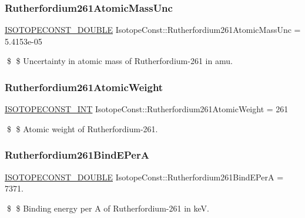 \subsubsection{\texorpdfstring{Rutherfordium261\+Atomic\+Mass\+Unc}{Rutherfordium261AtomicMassUnc}}
{\footnotesize\ttfamily \mbox{\hyperlink{group___isotope_const-_macros_ga8f45a7272ce02c0b4c65c44636ed719a}{I\+S\+O\+T\+O\+P\+E\+C\+O\+N\+S\+T\+\_\+\+D\+O\+U\+B\+LE}} Isotope\+Const\+::\+Rutherfordium261\+Atomic\+Mass\+Unc = 5.\+4153e-\/05}

\$ \$ Uncertainty in atomic mass of Rutherfordium-\/261 in amu. \mbox{\label{group___isotope_const-_rutherfordium-_rf261_ga20d02417a0fca27503c16a4dd4f8ef2a}} 
\subsubsection{\texorpdfstring{Rutherfordium261\+Atomic\+Weight}{Rutherfordium261AtomicWeight}}
{\footnotesize\ttfamily \mbox{\hyperlink{group___isotope_const-_macros_ga5f18360b3e99483a35c32d789e62621c}{I\+S\+O\+T\+O\+P\+E\+C\+O\+N\+S\+T\+\_\+\+I\+NT}} Isotope\+Const\+::\+Rutherfordium261\+Atomic\+Weight = 261}

\$ \$ Atomic weight of Rutherfordium-\/261. \mbox{\label{group___isotope_const-_rutherfordium-_rf261_gada5d94af160987d114c641e15546daad}} 
\subsubsection{\texorpdfstring{Rutherfordium261\+Bind\+E\+PerA}{Rutherfordium261BindEPerA}}
{\footnotesize\ttfamily \mbox{\hyperlink{group___isotope_const-_macros_ga8f45a7272ce02c0b4c65c44636ed719a}{I\+S\+O\+T\+O\+P\+E\+C\+O\+N\+S\+T\+\_\+\+D\+O\+U\+B\+LE}} Isotope\+Const\+::\+Rutherfordium261\+Bind\+E\+PerA = 7371.}

\$ \$ Binding energy per A of Rutherfordium-\/261 in keV. \mbox{\label{group___isotope_const-_rutherfordium-_rf261_ga6b6e7154413f758b1534a326da564d20}} 
